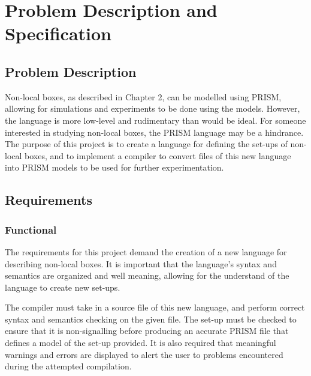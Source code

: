 \documentclass[report.tex]{subfiles}
\begin{document}
\chapter{Problem Description and Specification} %
\label{cha:problem_description_and_specification}


\section{Problem Description} %
\label{sec:problem_description}
Non-local boxes, as described in Chapter 2, can be modelled using PRISM, 
allowing for simulations and experiments to be done using the models. However,
the language is more low-level and rudimentary than would be ideal. For someone
interested in studying non-local boxes, the PRISM language may be a hindrance.
The purpose of this project is to create a language for defining the set-ups of
non-local boxes, and to implement a compiler to convert files of this new
language into PRISM models to be used for further experimentation.


\section{Requirements} %
\label{sec:requirements}

\subsection{Functional} %
\label{sub:functional}
The requirements for this project demand the creation of a new language for
describing non-local boxes. It is important that the language's syntax and
semantics are organized and well meaning, allowing for the understand of the
language to create new set-ups.

The compiler must take in a source file of this new language, and perform
correct syntax and semantics checking on the given file. The set-up must be
checked to ensure that it is non-signalling before producing an accurate PRISM
file that defines a model of the set-up provided. It is also required that
meaningful warnings and errors are displayed to alert the user to problems
encountered during the attempted compilation.
\end{document}
